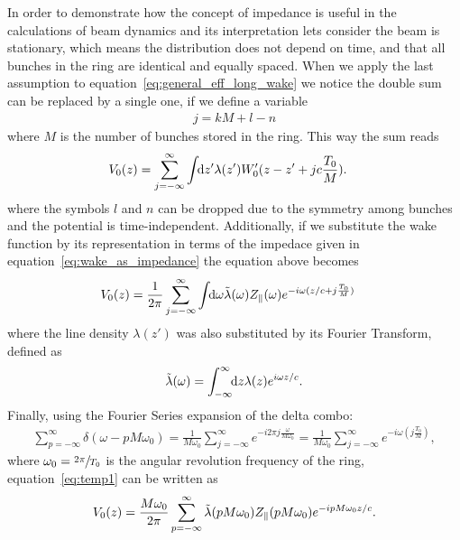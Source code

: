     In order to demonstrate how the concept of impedance is useful in the calculations of beam dynamics and its interpretation lets consider the beam is stationary, which means the distribution does not depend on time, and that all bunches in the ring are identical and equally spaced. When we apply the last assumption to equation~\eqref{eq:general_eff_long_wake} we notice the double sum can be replaced by a single one, if we define a variable
    \begin{align*}
    	  j = kM + l - n
    \end{align*}
    where $M$ is the number of bunches stored in the ring. This way the sum reads
    \begin{align}
	  	V_0(z) = \sum_{j=-\infty}^\infty\int\!\!\text{d}z' 
				&\lambda(z')W'_0(z-z' + jc\frac{T_0}{M}).
    \end{align}
    where the symbols $l$ and $n$ can be dropped due to the symmetry among bunches and the potential is time-independent. Additionally, if we substitute the wake function by its representation in terms of the impedace given in equation~\eqref{eq:wake_as_impedance} the equation above becomes
    \begin{align}\label{eq:temp1}
	   	V_0(z) = \frac{1}{2\pi}\sum_{j=-\infty}^\infty\int\!\!\text{d}\omega 
 				&\tilde{\lambda}(\omega)Z_\parallel(\omega)e^{-i\omega(z/c + j\frac{T_0}{M})}
    \end{align}
    where the line density $\lambda(z')$ was also substituted by its Fourier  Transform, defined as
    \begin{align}
  		\tilde{\lambda}(\omega) = \int_{-\infty}^{\infty}\!\!\text{d}z \lambda(z)e^{i\omega z/c}.
    \end{align}
    Finally, using the Fourier Series expansion of the delta combo:
    \begin{align}
  	  	\sum_{p=-\infty}^\infty \delta(\omega-pM\omega_0) =
	    	\frac{1}{M\omega_0} \sum_{j=-\infty}^\infty e^{-i2\pi j\frac{\omega}{M\omega_0}} =
	    	\frac{1}{M\omega_0} \sum_{j=-\infty}^\infty e^{-i\omega(j\frac{T_0}{M})},
    \end{align}
    where $\omega_0 = \sfrac{2\pi}{T_0}$ is the angular revolution frequency of the ring, equation~\eqref{eq:temp1} can be written as
    \begin{align}\label{eq:impedance_interpretation}
	  	V_0(z) = \frac{M\omega_0}{2\pi} \sum_{p=-\infty}^\infty \tilde{\lambda}(pM\omega_0)Z_\parallel(pM\omega_0)e^{-ipM\omega_0 z/c}.
    \end{align}
